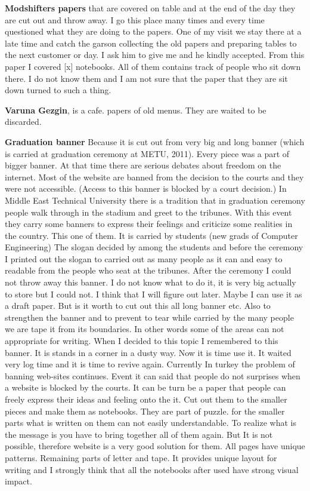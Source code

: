 \textbf{Modshifters papers} that are covered on table and at the end of the day they are cut out and throw away. I go this place many times and every time questioned what they are doing to the papers. One of my visit we stay there at a late time and catch the garson collecting the old papers and preparing tables to the next customer or day. I ask him to give me and he kindly accepted. From this paper I covered [x] notebooks. All of them contains track of people who sit down there. I do not know them and I am not sure that the paper that they are sit down turned to such a thing.

\textbf{Varuna Gezgin}, is a cafe. papers of old menus. They are waited to be discarded. 

\textbf{Graduation banner} Because it is cut out from very big and long banner (which is carried at graduation ceremony at METU, 2011). Every piece was a part of bigger banner. At that time there are serious debates about freedom on the internet. Most of the website are banned from the decision to the courts and they were not accessible. (Access to this banner is blocked by a court decision.) In Middle East Technical University there is a tradition that in graduation ceremony people walk through in the stadium and greet to the tribunes. With this event they carry some banners to express their feelings and criticize some realities in the country. This one of them. It is carried by students (new grads of Computer Engineering) The slogan decided by among the students and before the ceremony I printed out the slogan to carried out as many people as it can and easy to readable from the people who seat at the tribunes. After the ceremony I could not throw away this banner. I do not know what to do it, it is very big actually to store but I could not. I think that I will figure out later. Maybe I can use it as a draft paper. But is it worth to cut out this all long banner etc. Also to strengthen the banner and to prevent to tear while carried by the many people we are tape it from its boundaries. In other words some of the areas can not appropriate for writing. When I decided to this topic I remembered to this banner. It is stands in a corner in a dusty way. Now it is time use it. It waited very log time and it is time to revive again. Currently In turkey the problem of banning web-sites continues. Event it can said that people do not surprises when a website is blocked by the courts. It can be turn be a paper that people can freely express their ideas and feeling onto the it. Cut out them to the smaller pieces and make them as notebooks. They are part of puzzle. for the smaller parts what is written on them can not easily understandable. To realize what is the message is you have to bring together all of them again. But It is not possible, therefore website is a very good solution for them. All pages have unique patterns. Remaining parts of letter and tape. It provides unique layout for writing and I strongly think that all the notebooks after used have strong visual impact.


